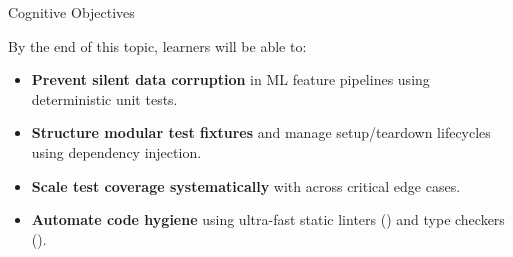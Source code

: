 \documentclass[../m00-session-04.tex]{subfiles}
\begin{document}

\begin{frame}{Cognitive Objectives}
  \begin{LearningObjectives}{By the end of this topic, learners will be able to:}
    \begin{itemize}\setlength{\itemsep}{0.28em}
      \item \textbf{Prevent silent data corruption} in ML feature pipelines using deterministic unit tests.
      \item \textbf{Structure modular test fixtures} and manage setup/teardown lifecycles using dependency injection.
      \item \textbf{Scale test coverage systematically} with  across critical edge cases.
      \item \textbf{Automate code hygiene} using ultra-fast static linters () and type checkers ().
    \end{itemize}
  \end{LearningObjectives}
\end{frame}
\end{document}
